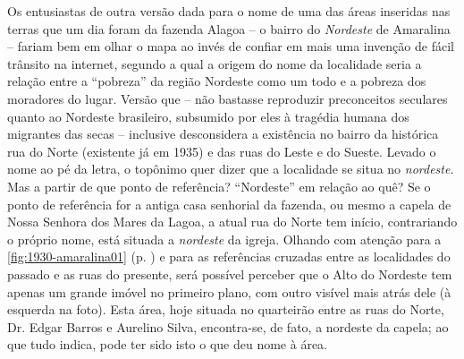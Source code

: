 
Os entusiastas de outra versão dada para o nome de uma das áreas inseridas nas terras que um dia foram da fazenda Alagoa -- o bairro do \textit{Nordeste} de Amaralina -- fariam bem em olhar o mapa ao invés de confiar em mais uma invenção de fácil trânsito na internet, segundo a qual a origem do nome da localidade seria a relação entre a ``pobreza'' da região Nordeste como um todo e a pobreza dos moradores do lugar. Versão que -- não bastasse reproduzir preconceitos seculares quanto ao Nordeste brasileiro, subsumido por eles à tragédia humana dos migrantes das secas -- inclusive desconsidera a existência no bairro da histórica rua do Norte (existente já em 1935) e das ruas do Leste e do Sueste. Levado o nome ao pé da letra, o topônimo quer dizer que a localidade se situa no \textit{nordeste}. Mas a partir de que ponto de referência? ``Nordeste'' em relação ao quê? Se o ponto de referência for a antiga casa senhorial da fazenda, ou mesmo a capela de Nossa Senhora dos Mares da Lagoa, a atual rua do Norte tem início, contrariando o próprio nome, está situada a \textit{nordeste} da igreja. Olhando com atenção para a \autoref{fig:1930-amaralina01} (p. \pageref{fig:1930-amaralina01}) e para as referências cruzadas entre as localidades do passado e as ruas do presente, será possível perceber que o Alto do Nordeste tem apenas um grande imóvel no primeiro plano, com outro visível mais atrás dele (à esquerda na foto). Esta área, hoje situada no quarteirão entre as ruas do Norte, Dr. Edgar Barros e Aurelino Silva, encontra-se, de fato, a nordeste da capela; ao que tudo indica, pode ter sido isto o que deu nome à área.


